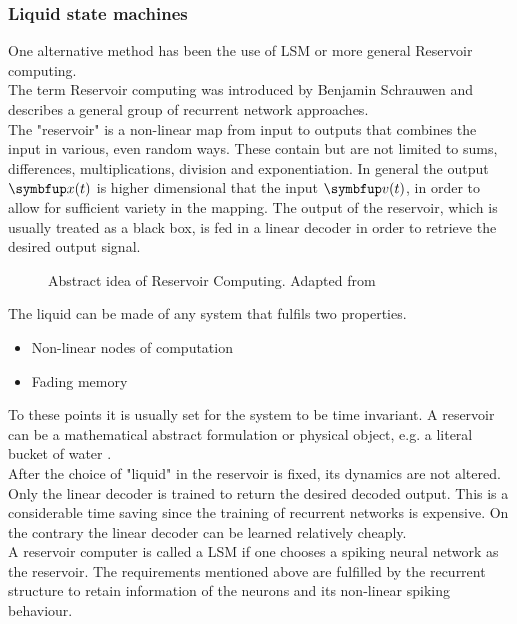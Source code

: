 \subsubsection{Liquid state machines}
One alternative method has been the use of \ac{LSM} or more general Reservoir computing.\\
The term Reservoir computing was introduced by Benjamin Schrauwen and describes a general group of recurrent network approaches\cite{verstraeten_experimental_2007}.\\
The "reservoir" is a non-linear map from input to outputs that combines the input in various, even random ways. These contain but are not limited to sums, differences, multiplications, division and exponentiation. In general the output $\bmu{x}(t)$ is higher dimensional that the input $\bmu{v}(t)$, in order to allow for sufficient variety in the mapping. The output of the reservoir, which is usually treated as a black box, is fed in a linear decoder in order to retrieve the desired output signal.\\
\begin{figure}
	\centering
	
	\caption{Abstract idea of Reservoir Computing. Adapted from \cite{cooper_liquid_2011}}
	\label{fig:reservoir_computing}
\end{figure}
The liquid can be made of any system that fulfils two properties.\\
\begin{itemize}
	\item Non-linear nodes of computation
	\item Fading memory
\end{itemize}
To these points it is usually set for the system to be time invariant\cite{cooper_liquid_2011}.
A reservoir can be a mathematical abstract formulation or physical object, e.g. a literal bucket of water \cite{tanaka_recent_2019}.\\
After the choice of "liquid" in the reservoir is fixed, its dynamics are not altered. Only the linear decoder is trained to return the desired decoded output\cite{jaeger_echo_2010}. This is a considerable time saving since the training of recurrent networks is expensive. On the contrary the linear decoder can be learned relatively cheaply.\\
A reservoir computer is called a \ac{LSM} if one chooses a spiking neural network as the reservoir. The requirements mentioned above are fulfilled by the recurrent structure to retain information of the neurons and its non-linear spiking behaviour.\\
